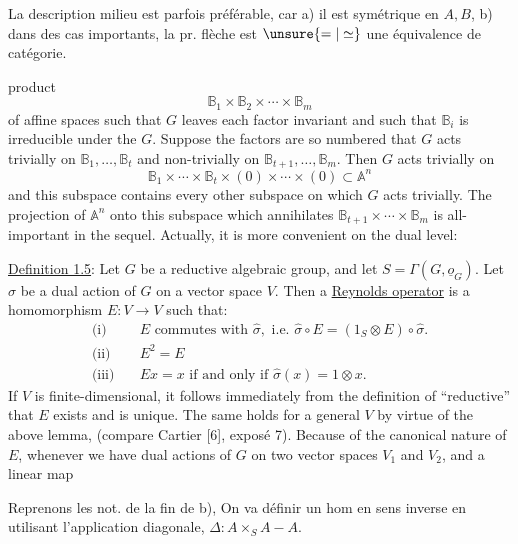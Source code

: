La description   milieu est parfois préférable, car a) il est  symétrique en $A,B$, b) dans des cas importants, la pr. flèche est $\unsure{=|\simeq}$ une équivalence de catégorie.



product
\[
\mathbb B_1\times\mathbb B_2\times\cdots\times\mathbb B_m
\]
of affine spaces such that $G$ leaves each factor invariant and such that $\mathbb B_i$ is irreducible under the  $G$. Suppose the factors are so numbered that $G$ acts trivially on $\mathbb B_1,\ldots,\mathbb B_t$ and non-trivially on $\mathbb B_{t+1},\ldots,\mathbb B_m$. Then $G$ acts trivially on
\[
\mathbb B_1\times\cdots\times\mathbb B_t\times(0)\times\cdots\times(0)\subset\mathbb A^n
\]
and this subspace contains every other subspace on which $G$ acts trivially. The projection of $\mathbb A^n$ onto this subspace which annihilates $\mathbb B_{t+1}\times\cdots\times\mathbb B_m$ is all-important in the sequel. Actually, it is more convenient on the dual level:

\uline{Definition 1.5}: Let $G$ be a reductive algebraic group, and let $S=\Gamma(G,\underline{o}_G)$. Let $\hat\sigma$ be a dual action of $G$ on a vector space $V$. Then a \uline{Reynolds operator} is a homomorphism $E:V\longrightarrow V$ such that:
\[
\begin{aligned}
\text{(i)}\quad &E\text{ commutes with }\hat\sigma,\text{ i.e. }\hat\sigma\circ E=(1_S\otimes E)\circ\hat\sigma.\\
\text{(ii)}\quad &E^2=E\\
\text{(iii)}\quad &Ex=x\text{ if and only if }\hat\sigma(x)=1\otimes x.
\end{aligned}
\]
If $V$ is finite-dimensional, it follows immediately from the definition of ``reductive'' that $E$ exists and is unique. The same holds for a general $V$ by virtue of the above lemma, (compare Cartier [6], exposé 7). Because of the canonical nature of $E$, whenever we have dual actions of $G$ on two vector spaces $V_1$ and $V_2$, and a linear map



Reprenons les not.  de la fin de b), On va définir un hom en sens inverse
en utilisant l'application diagonale, $\Delta:A\times_S A\mathbin{-}A$.

